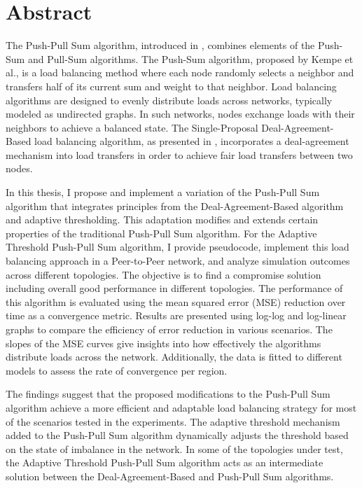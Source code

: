 \chapter*{Abstract}

The Push-Pull Sum algorithm, introduced in \cite{nugroho2023PushPullSumDataAg}, combines elements of the Push-Sum \cite{kempe2003gossipbasedComp} and Pull-Sum algorithms. The Push-Sum algorithm, proposed by Kempe et al., is a load balancing method where each node randomly selects a neighbor and transfers half of its current sum and weight to that neighbor. Load balancing algorithms are designed to evenly distribute loads across networks, typically modeled as undirected graphs. In such networks, nodes exchange loads with their neighbors to achieve a balanced state. The Single-Proposal Deal-Agreement-Based load balancing algorithm, as presented in \cite{Dinitz2023DAB}, incorporates a deal-agreement mechanism into load transfers in order to achieve fair load transfers between two nodes.

In this thesis, I propose and implement a variation of the Push-Pull Sum algorithm that integrates principles from the Deal-Agreement-Based algorithm and adaptive thresholding. This adaptation modifies and extends certain properties of the traditional Push-Pull Sum algorithm. For the Adaptive Threshold Push-Pull Sum algorithm, I provide pseudocode, implement this load balancing approach in a Peer-to-Peer network, and analyze simulation outcomes across different topologies. The objective is to find a compromise solution including overall good performance in different topologies. The performance of this algorithm is evaluated using the mean squared error (MSE) reduction over time as a convergence metric. Results are presented using log-log and log-linear graphs to compare the efficiency of error reduction in various scenarios. The slopes of the MSE curves give insights into how effectively the algorithms distribute loads across the network. Additionally, the data is fitted to different models to assess the rate of convergence per region.

The findings suggest that the proposed modifications to the Push-Pull Sum algorithm achieve a more efficient and adaptable load balancing strategy for most of the scenarios tested in the experiments. The adaptive threshold mechanism added to the Push-Pull Sum algorithm dynamically adjusts the threshold based on the state of imbalance in the network. In some of the topologies under test, the Adaptive Threshold Push-Pull Sum algorithm acts as an intermediate solution between the Deal-Agreement-Based and Push-Pull Sum algorithms.